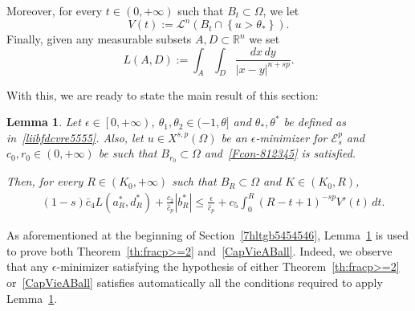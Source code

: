 \documentclass[12pt]{article}
\newcommand{\R}{\mathbb{R}}
\numberwithin{equation}{section}
\newtheorem{lem}[thm]{Lemma}
\renewcommand{\leq}{\leqslant}
\begin{document}
Moreover, for every $t\in (0,+\infty)$ such that $B_t\subset \Omega$, we let 
\begin{equation}\label{rfdlopcbgft5}
V(t):=\mathcal{L}^n(B_t\cap \left\lbrace u>\theta_* \right\rbrace). 
\end{equation}
Finally, given any measurable subsets $A,D\subset \R^n$ we set 
\begin{equation}\label{ellead}
L(A,D):=\int_{A}\int_{D}\frac{dx\,dy}{\left|x-y\right|^{n+sp}}. 
\end{equation}


With this, we are ready to state the main result of this section: 
\begin{lem}\label{gliorigamieriopachi}
Let $\epsilon\in \left[0,+\infty\right)$, $\theta_1,\theta_2\in (-1,\theta]$ and $\theta_*,\theta^*$ be defined as in~\eqref{liibfdcvre5555}. Also, let $u\in X^{s,p}(\Omega)$ be an $\epsilon$-minimizer for $\mathcal{E}_s^p$ and $c_0,r_0\in (0,+\infty)$ be such that $B_{r_0}\subset \Omega$ and~\eqref{Fcon-812345} is satisfied.  

Then, for every $R\in \left(K_0,+\infty\right)$ such that $B_R\subset\Omega$ and $K\in (K_0,R)$,
\begin{equation}\label{iattoll-90843}
\begin{split}
&(1-s)\bar{c}_4 L(a_R^*,d_R^*) +\frac{c_2}{\hat{c}_p}\left|b_R^*\right| \leq \frac{\epsilon }{\hat{c}_p}+c_5 \int_{0}^R \left(R-t+1\right)^{-sp}V'(t)\,dt.    
\end{split}
\end{equation}
\end{lem}

As aforementioned at the beginning of Section~\ref{7hltgb5454546}, Lemma~\ref{gliorigamieriopachi} is used to prove both Theorem~\ref{th:fracp>=2} and~\ref{CapVieABall}. Indeed, we observe that any $\epsilon$-minimizer satisfying the hypothesis of either Theorem~\ref{th:fracp>=2} or~\ref{CapVieABall} satisfies automatically all the conditions required to apply Lemma~\ref{gliorigamieriopachi}. 
\end{document}
